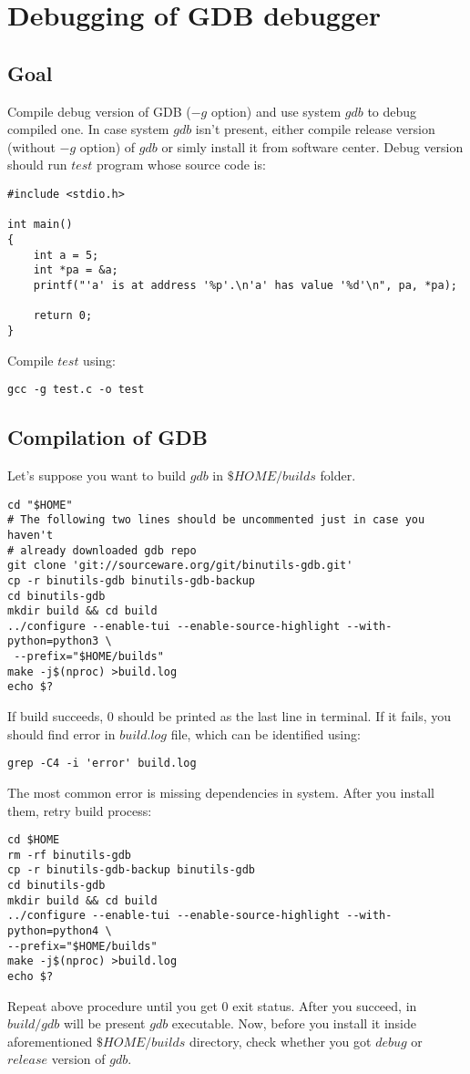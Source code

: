 \documentclass{report}
\begin{document}
\chapter *{Debugging of GDB debugger}
\section *{Goal}
Compile debug version of GDB ($-g$ option) and use system $gdb$ to debug compiled one. In case system $gdb$ isn't present, either compile release version (without $-g$ option) of $gdb$ or simly install it from software center. Debug version should run $test$ program whose source code is:
\begin{verbatim}
#include <stdio.h>
   
int main()
{
	int a = 5;
	int *pa = &a;
	printf("'a' is at address '%p'.\n'a' has value '%d'\n", pa, *pa);

	return 0;
}
\end{verbatim}
Compile $test$ using:
\begin{verbatim}
gcc -g test.c -o test
\end{verbatim}
\section *{Compilation of GDB}
Let's suppose you want to build $gdb$ in $\$HOME/builds$ folder. 
\begin{verbatim}
cd "$HOME"
# The following two lines should be uncommented just in case you haven't 
# already downloaded gdb repo
git clone 'git://sourceware.org/git/binutils-gdb.git'
cp -r binutils-gdb binutils-gdb-backup   
cd binutils-gdb
mkdir build && cd build
../configure --enable-tui --enable-source-highlight --with-python=python3 \
 --prefix="$HOME/builds"
make -j$(nproc) >build.log
echo $?
\end{verbatim}
If build succeeds, $0$ should be printed as the last line in terminal. If it fails, you should find error in $build.log$ file, which can be identified using:
\begin{verbatim}
grep -C4 -i 'error' build.log
\end{verbatim}
The most common error is missing dependencies in system. After you install them, retry build process:
\begin{verbatim}
cd $HOME
rm -rf binutils-gdb
cp -r binutils-gdb-backup binutils-gdb
cd binutils-gdb
mkdir build && cd build
../configure --enable-tui --enable-source-highlight --with-python=python4 \
--prefix="$HOME/builds"
make -j$(nproc) >build.log
echo $?
\end{verbatim}
Repeat above procedure until you get $0$ exit status. After you succeed, in $build/gdb$ will be present $gdb$ executable. Now, before you install it inside aforementioned $\$HOME/builds$ directory, check whether you got $debug$ or $release$ version of $gdb$.
\end{document}
